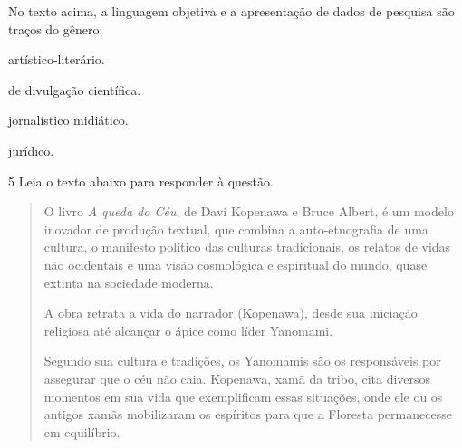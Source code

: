 
No texto acima, a linguagem objetiva e a apresentação de dados de pesquisa são traços do 
gênero:

\begin{escolha}

    \item artístico-literário.

    \item de divulgação científica.

    \item jornalístico midiático.

    \item jurídico.

\end{escolha}

\num{5} Leia o texto abaixo para responder à questão. 

\begin{quote}

O livro \textit{A queda do Céu}, de Davi Kopenawa e Bruce Albert, é um modelo
inovador de produção textual, que combina a auto-etnografia de uma
cultura, o manifesto político das culturas tradicionais, os relatos de
vidas não ocidentais e uma visão cosmológica e espiritual do mundo,
quase extinta na sociedade moderna.

A obra retrata a vida do narrador (Kopenawa), desde sua iniciação
religiosa até alcançar o ápice como líder Yanomami.

Segundo sua cultura e tradições, os Yanomamis são os responsáveis por
assegurar que o céu não caia. Kopenawa, xamã da tribo, cita diversos
momentos em sua vida que exemplificam essas situações, onde ele ou os
antigos xamãs mobilizaram os espíritos para que a Floresta permanecesse
em equilíbrio.

\end{quote}



